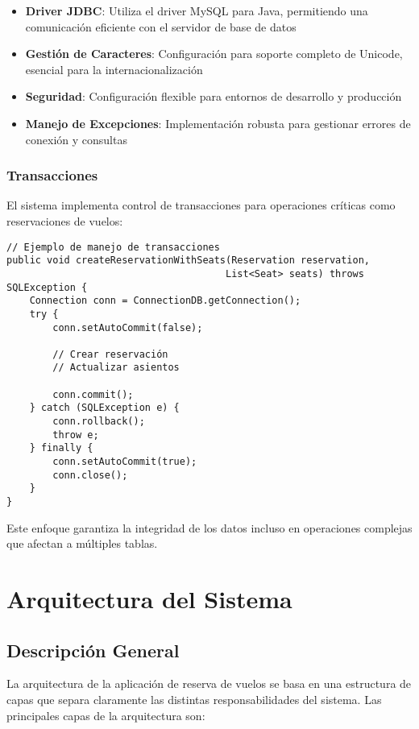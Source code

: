 \documentclass[12pt,a4paper]{article}
\begin{document}
\begin{itemize}
    \item \textbf{Driver JDBC}: Utiliza el driver MySQL para Java, permitiendo una comunicación eficiente con el servidor de base de datos
    \item \textbf{Gestión de Caracteres}: Configuración para soporte completo de Unicode, esencial para la internacionalización
    \item \textbf{Seguridad}: Configuración flexible para entornos de desarrollo y producción
    \item \textbf{Manejo de Excepciones}: Implementación robusta para gestionar errores de conexión y consultas
\end{itemize}

\subsubsection{Transacciones}

El sistema implementa control de transacciones para operaciones críticas como reservaciones de vuelos:

\begin{verbatim}
// Ejemplo de manejo de transacciones
public void createReservationWithSeats(Reservation reservation,
                                      List<Seat> seats) throws SQLException {
    Connection conn = ConnectionDB.getConnection();
    try {
        conn.setAutoCommit(false);

        // Crear reservación
        // Actualizar asientos

        conn.commit();
    } catch (SQLException e) {
        conn.rollback();
        throw e;
    } finally {
        conn.setAutoCommit(true);
        conn.close();
    }
}
\end{verbatim}

Este enfoque garantiza la integridad de los datos incluso en operaciones complejas que afectan a múltiples tablas.

\section{Arquitectura del Sistema}

\subsection{Descripción General}

La arquitectura de la aplicación de reserva de vuelos se basa en una estructura de capas que separa claramente las distintas responsabilidades del sistema. Las principales capas de la arquitectura son:
\end{document}
